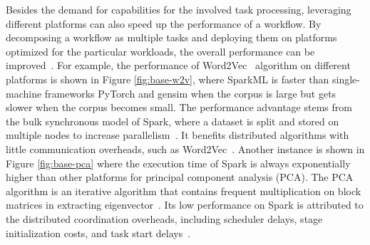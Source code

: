 Besides the demand for capabilities for the involved task processing, leveraging different platforms can also speed up the performance of a workflow. 
By decomposing a workflow as multiple tasks and deploying them on platforms optimized for the particular workloads, the overall performance can be improved~\cite{agrawal2016rheem, gog2015musketeer, gittens2018accelerating, tan2017enabling, anderson2017bridging}. 
For example, the performance of Word2Vec~\cite{mikolov2013efficient} algorithm on different platforms is shown in Figure \ref{fig:base-w2v}, where SparkML is faster than single-machine frameworks PyTorch and gensim when the corpus is large but gets slower when the corpus becomes small. 
The performance advantage stems from the bulk synchronous model of Spark, where a dataset is split and stored on multiple nodes to increase parallelism~\cite{zaharia2016apache}. 
It benefits distributed algorithms with little communication overheads, such as Word2Vec~\cite{stergiou2017distributed}. 
Another instance is shown in Figure \ref{fig:base-pca} where the execution time of Spark is always exponentially higher than other platforms for principal component analysis (PCA).
The PCA algorithm is an iterative algorithm that contains frequent multiplication on block matrices in extracting eigenvector~\cite{gittens2016matrix}.
Its low performance on Spark is attributed to the distributed coordination overheads, including scheduler delays, stage initialization costs, and task start delays~\cite{gittens2018accelerating, bosagh2016matrix}.

